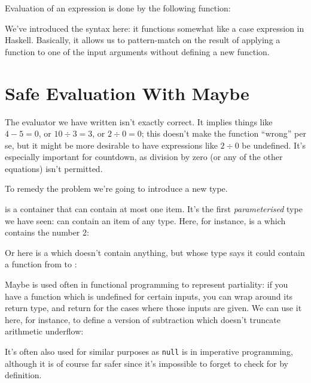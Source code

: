 Evaluation of an expression is done by the following function:
\begin{agdalisting}
\end{agdalisting}
We've introduced the  syntax here: it functions somewhat like
a case expression in Haskell.
Basically, it allows us to pattern-match on the result of applying a function to
one of the input arguments without defining a new function.
\section{Safe Evaluation With Maybe}
The evaluator we have written isn't exactly correct.
It implies things like \(4 - 5 = 0\), or \(10 \div 3 = 3\), or \(2 \div 0 = 0\);
this doesn't make the function ``wrong'' per se, but it might be more desirable
to have expressions like \(2 \div 0\) be undefined.
It's especially important for countdown, as division by zero (or any of the
other equations) isn't permitted.

To remedy the problem we're going to introduce a new type.
\begin{agdalisting}
\end{agdalisting}
 is a container that can contain at most one item.
It's the first \emph{parameterised} type we have seen:  can
contain an item of any type.
Here, for instance, is a  which contains the number 2:
\begin{agdalisting*}
\end{agdalisting*}
Or here is a  which doesn't contain anything, but whose type
says it could contain a function from  to :
\begin{agdalisting*}
\end{agdalisting*}

Maybe is used often in functional programming to represent partiality: if you
have a function which is undefined for certain inputs, you can wrap
 around its return type, and return
 for the cases where those inputs are given.
We can use it here, for instance, to define a version of subtraction which
doesn't truncate arithmetic underflow:
\begin{agdalisting}
\end{agdalisting}
It's often also used for similar purposes as \verb+null+ is in imperative
programming, although it is of course far safer since it's impossible to forget
to check for  by definition.

